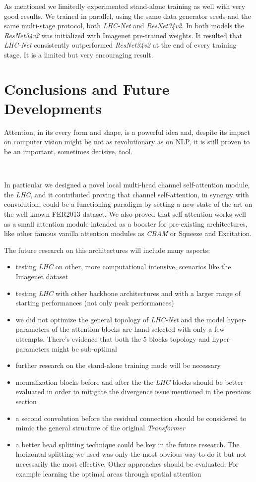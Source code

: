 \documentclass[fleqn,10pt]{SelfArx}
\begin{document}
As mentioned we limitedly experimented stand-alone training as well with very good results. We trained in parallel, using the same data generator seeds and the same multi-stage protocol, both \textit{LHC-Net} and \textit{ResNet34v2}. In both models the \textit{ResNet34v2} was initialized with Imagenet pre-trained weights. It resulted that \textit{LHC-Net} consistently outperformed \textit{ResNet34v2} at the end of every training stage. It is a limited but very encouraging result.

\section{Conclusions and Future Developments}
Attention, in its every form and shape, is a powerful idea and, despite its impact on computer vision might be not as revolutionary as on NLP, it is still proven to be an important, sometimes decisive, tool.

\

In particular we designed a novel local multi-head channel self-attention module, the \textit{LHC},  and it contributed proving that channel self-attention, in synergy with convolution, could be a functioning paradigm by setting a new state of the art on the well known FER2013 dataset. We also proved that self-attention works well as a small attention module intended as a booster for pre-existing architectures, like other famous vanilla attention modules as \textit{CBAM} or Squeeze and Excitation.

The future research on this architectures will include many aspects:

\begin{itemize}
\item testing \textit{LHC} on other, more computational intensive, scenarios like the Imagenet dataset
\item testing \textit{LHC} with other backbone architectures and with a larger range of starting performances (not only peak performances)
\item we did not optimize the general topology of \textit{LHC-Net} and the model hyper-parameters of the attention blocks are hand-selected with only a few attempts. There's evidence that both the $5$ blocks topology and hyper-parameters might be sub-optimal
\item further research on the stand-alone training mode will be necessary
\item normalization blocks before and after the the \textit{LHC} blocks should be better evaluated in order to mitigate the divergence issue mentioned in the previous section
\item a second convolution before the residual connection should be considered to mimic the general structure of the original \textit{Transformer}
\item a better head splitting technique could be key in the future research. The horizontal splitting we used was only the most obvious way to do it but not necessarily the most effective. Other approaches should be evaluated. For example learning the optimal areas through spatial attention
\end{itemize}
\end{document}
